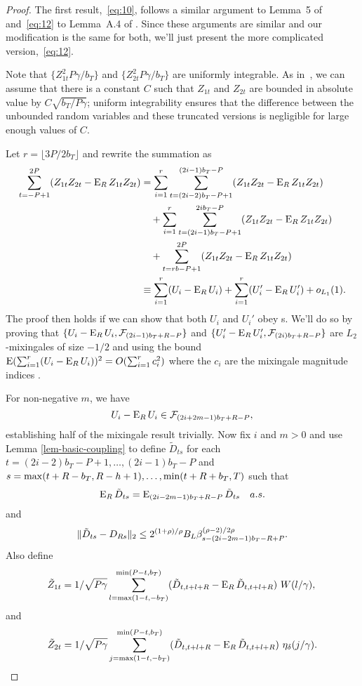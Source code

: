 \documentclass[11pt]{article}
\begin{document}
\begin{proof}
\newcommand{\UFiltration}[1]{\ensuremath{\mathcal{F}_{(#1)b_{T}+R-P}}}%
The first result,~\eqref{eq:10}, follows a similar argument to Lemma~5
of \citet{Jon:97} and~\eqref{eq:12} to Lemma~A.4 of \citet{JoD:00}.
Since these arguments are similar and our modification is the same for
both, we'll just present the more complicated version,~\eqref{eq:12}.

Note that $\{Z_{1t}^2 P\gamma/b_T\}$ and $\{Z_{2t}^2 P\gamma/b_T\}$
are uniformly integrable.  As in~\citet[Lemma A.4]{JoD:00}, we can
assume that there is a constant $C$ such that $Z_{1t}$ and $Z_{2t}$
are bounded in absolute value by $C\sqrt{b_T/P\gamma}$; uniform
integrability ensures that the difference between the unbounded random
variables and these truncated versions is negligible for large enough
values of $C$.  

Let $r = \lfloor 3P/2b_T \rfloor$ and rewrite the summation as
\begin{align*}
  \sum_{t=-P+1}^{2P} (Z_{1t}Z_{2t} - \operatorname{E}_RZ_{1t}Z_{2t}) &= \sum_{i=1}^r \sum_{t=(2i-2)b_T-P+1}^{(2i-1)b_T-P} (Z_{1t}Z_{2t} - \operatorname{E}_RZ_{1t}Z_{2t}) \\
  &\quad+ \sum_{i=1}^r \sum_{t=(2i-1)b_T-P+1}^{2ib_T-P} (Z_{1t}Z_{2t} - \operatorname{E}_RZ_{1t}Z_{2t}) \\
  &\quad+ \sum_{t=r b - P + 1}^{2P} (Z_{1t}Z_{2t} - \operatorname{E}_RZ_{1t}Z_{2t}) \\
  &\equiv \sum_{i=1}^r (U_i - \operatorname{E}_R U_i) + \sum_{i=1}^r (U_i' - \operatorname{E}_R U_i') + o_{L_1}(1).
\end{align*}
The proof then holds if we can show that both $U_i$ and $U_i'$ obey
\lln s.  We'll do so by proving that $\{U_i -\E_R U_i,
\UFiltration{2i-1}\}$ and $\{U_i' - \E_R U_i', \UFiltration{2i}\}$ are
$L_2$-mixingales of size $-1/2$ and using the bound $\operatorname{E}(\sum_{i=1}^r (U_i -
\operatorname{E}_R U_i))^2 = O(\sum_{i=1}^r c_i^2)$ where the $c_i$ are the mixingale
magnitude indices \citep{Mcl:75}.

For non-negative $m$, we have 
\begin{equation*}
U_i - \E_R U_i \in \UFiltration{2i+2m-1},
\end{equation*}
establishing half of the mixingale result trivially.  Now fix $i$ and $m >
0$ and use Lemma \ref{lem-basic-coupling} to define $\tilde{D}_{ts}$
for each $t =(2i-2)b_T-P+1,\dots,(2i-1)b_T-P$ and $s =
\max(t+R-b_T,R-h+1),\dots,\min(t+R+b_T,T)$ such that
\begin{equation*}
 \operatorname{E}_R \tilde D_{ts} = \operatorname{E}_{(2i-2m-1)b_T+R-P} \tilde D_{ts} \quad a.s.
\end{equation*}
and
\begin{equation*}
  \lVert \tilde D_{ts} - D_{Rs} \rVert_2 \leq 2^{(1+\rho)/\rho} B_L \beta^{(\rho-2)/2\rho}_{s - (2i-2m-1)b_T-R+P}.
\end{equation*}
Also define
\begin{equation*}
  \tilde Z_{1t} = 1/\sqrt{P\gamma} \sum_{l=\max(1-t,-b_T)}^{\min(P-t,b_T)}
  (\tilde D_{t,t+l+R} - \operatorname{E}_R\tilde D_{t,t+l+R})\ W(l/\gamma), \\
\end{equation*}
and
\begin{equation*}
\tilde Z_{2t} = 1/\sqrt{P\gamma} \sum_{j=\vttLower}^{\vttUpper}
    (\tilde D_{t,t+l+R} - \E_R\tilde D_{t,t+l+R})\ \kernelB{j/\gamma}.
\end{equation*}


\end{proof}
\end{document}
